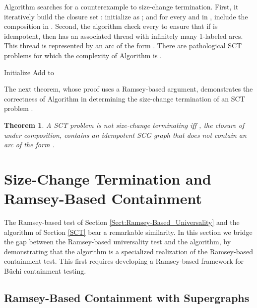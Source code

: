 \documentclass{LMCS}
\newtheorem{theorem}{Theorem}[section]
\newcommand\buchi{B\"uchi }
\begin{document}
Algorithm \LJB searches for a counterexample to size-change termination.  First, it iteratively
build the closure set : initialize  as ; and for every  and  in , include the composition  in .  Second, the algorithm  check
every  to ensure that if  is idempotent, then  has an
associated thread with infinitely many 1-labeled arcs. This thread is represented by an arc of the
form . There are pathological SCT problems for which the complexity of Algorithm
\LJB is .

\begin{algorithm}[htb]\label{Alg:LJB}
\caption{}
\DontPrintSemicolon
{}
  Initialize \;
  {
  {
    \;
    Add  to \;
    {
       {
       }
    }
  }
  }
\end{algorithm}

The next theorem, whose proof uses a Ramsey-based argument,
demonstrates the correctness of Algorithm \LJB in determining the size-change
termination of an SCT problem .

\begin{theorem}{\rm \cite{LJB01}}\label{Graph_Algorithm}
A SCT problem  is \emph{not} size-change terminating iff
, the closure of  under composition, contains an idempotent SCG graph  that does \emph{not} contain an arc of the form . 
\end{theorem}


\section{Size-Change Termination and Ramsey-Based Containment}\label{Sect:SCT_vs._Ramsey}
The Ramsey-based test of Section \ref{Sect:Ramsey-Based_Universality} and the
\LJB algorithm of Section \ref{SCT} bear a remarkable similarity. In this
section we bridge the gap between the Ramsey-based universality test and the
\LJB algorithm, by demonstrating that the \LJB algorithm is a specialized
realization of the Ramsey-based containment test. This first requires developing
a Ramsey-based framework for \buchi containment testing.

\subsection{Ramsey-Based Containment with Supergraphs}\label{Sect:Supergraphs}
\end{document}
